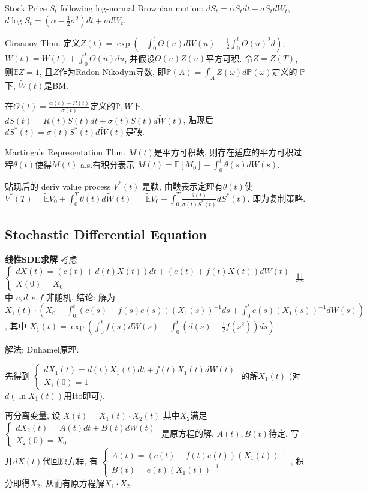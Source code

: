 \documentclass[UTF8]{ctexart}
\begin{document}
Stock Price $S_t$ following log-normal Brownian motion:
$dS_t = \alpha S_t dt + \sigma S_t dW_t$,
$d \log S_t = (\alpha -\frac{1}{2}\sigma^2)dt+\sigma dW_t$.

Girsanov Thm. 
定义$Z(t)=\exp\left(-\int_0^t \Theta(u)dW(u)-\frac12 \int_0^t \Theta(u)^2 d\right)$,
$\widetilde{W}(t)=W(t)+\int_0^t\Theta(u)du$,
并假设$\Theta(u)Z(u)$平方可积.
令$Z=Z(T)$, 则$\mathbb{E}Z=1$,
且$Z$作为Radon-Nikodym导数, 即$\widetilde{\mathbb{P}}(A)=\int_A Z(\omega)d\mathbb{P}(\omega)$定义的
$\widetilde{\mathbb{P}}$下, $\widetilde{W}(t)$是BM.

在$\Theta(t)=\frac{\alpha(t)-R(t)}{\sigma(t)}$定义的$\widetilde{\mathbb{P}},\widetilde{W}$下,
$dS(t)=R(t)S(t)dt+\sigma(t)S(t)d\widetilde{W}(t)$, 贴现后
$dS^*(t)=\sigma(t) S^*(t) d\widetilde{W}(t)$是鞅.

Martingale Representation Thm.
$M(t)$是平方可积鞅, 则存在适应的平方可积过程$\theta(t)$使得$M(t)$ a.s.有积分表示
$M(t)=\mathbb{E}[M_0]+\int_0^t \theta(s) dW(s)$.

贴现后的 deriv value process $V^*(t)$ 是鞅, 由鞅表示定理有$\theta(t)$使
$V^*(T)=\widetilde{\mathbb{E}}V_0 + \int_0^T \theta(t) d\widetilde{W}(t)$
$=\widetilde{\mathbb{E}}V_0 + \int_0^T \frac{\theta(t)}{\sigma(t)S^*(t)} dS^*(t)$,
即为复制策略.

\subsection{Stochastic Differential Equation}

\textbf{线性SDE求解}  考虑$\left\{\begin{array}{l}
d X(t)=(c(t)+d(t) X(t)) d t+(e(t)+f(t) X(t)) d W(t) \\
X(0)=X_0 \end{array}\right. $
其中 $c,d,e,f$ 非随机. 
结论: 解为 $X_1(t) \cdot\left(X_0+\int_0^t(c(s)-f(s) e(s))\left(X_1(s)\right)^{-1} d s
+\int_0^t e(s) \left(X_1(s)\right)^{-1} d W(s)\right)$,
其中 $X_1(t)=\exp \left(\int_0^t f(s) d W(s)-\int_0^t (d(s)-\frac{1}{2} f(s^2)) d s\right)$.

解法: Duhamel原理.

先得到 $\left\{\begin{array}{l}d X_1(t)=d(t) X_1(t) d t+f(t) X_1(t) d W(t) \\ X_1(0)=1\end{array}\right.$
的解$X_1(t)$ (对$d\left(\ln X_1(t)\right)$用Ito即可).

再分离变量, 设 $X(t)=X_1(t) \cdot X_2(t)$ 其中$X_2$满足 $\left\{\begin{array}{l}d X_2(t)=A(t) d t+B(t) d W(t) \\ X_2(0)=X_0\end{array}\right.$ 
是原方程的解, $A(t),B(t)$待定.
写开$dX(t)$代回原方程, 有
$\left\{\begin{array}{l}
A(t)=(c(t)-f(t) e(t))\left(X_1(t)\right)^{-1} \\
B(t)=e(t)\left(X_1(t)\right)^{-1}
\end{array}\right.$, 积分即得$X_2$. 从而有原方程解$X_1\cdot X_2$.
\end{document}
